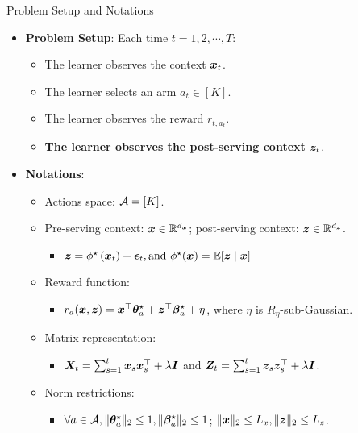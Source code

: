 \documentclass[10pt, xcolor={dvipsnames,x11names},compress]{beamer}
\begin{document}
\begin{frame}[label=Background]{Problem Setup and Notations}

\begin{itemize}
    \item \textbf{Problem Setup}: Each time $t = 1, 2, \cdots, T$:
    \begin{itemize}
        \item The learner observes the context ${\bm{x}}_t$.
        \item The learner selects an arm $a_t \in [K] $.
        \item The learner observes the reward $r_{t,a_t}$.
        \item \textcolor{dgreen}{\textbf{The learner observes the post-serving context ${\bm{z}}_t$}}.
    \end{itemize}
\end{itemize}


\begin{itemize} \color{gray}
    \item \textbf{Notations}:
    \begin{itemize} \color{gray}
        \item Actions space: ${\mathcal{A}} = [K]$.
        
        \item Pre-serving context: ${\bm{x}} \in {\mathbb{R}}^{d_{{\bm{x}}}}$; post-serving context: ${\bm{z}} \in {\mathbb{R}}^{d_{{\bm{z}}}}$.
        \begin{itemize} \color{gray}
            \item ${\bm{z}} = \phi^{\star}\left({\bm{x}}_t\right)+{\bm{\epsilon}}_t, \text{and } \phi^{\star}({\bm{x}})={\mathbb{E}}[{\bm{z}} \mid {\bm{x}}]$
        \end{itemize}
        
        \item Reward function: 
        \begin{itemize} \color{gray}
            \item $r_{a}({\bm{x}}, {\bm{z}}) = {\bm{x}}^\top {\bm{\theta}}_a^\star + {\bm{z}}^\top {\bm{\beta}}_a^\star + \eta$, where $\eta$ is $R_{\eta}$-sub-Gaussian.
        \end{itemize}
        
        \item Matrix representation: 
        \begin{itemize} \color{gray}
            \item ${\bm{X}}_{t} = \sum_{s=1}^t {\bm{x}}_s{\bm{x}}_s^\top + \lambda {\bm{I}}$ and ${\bm{Z}}_t = \sum_{s=1}^t {\bm{z}}_s {\bm{z}}_s^\top + \lambda {\bm{I}}$.
        \end{itemize}
        
        \item Norm restrictions: 
        \begin{itemize} \color{gray}
            \item $\forall a \in {\mathcal{A}}, \|{\bm{\theta}}_a^\star\|_2\leq 1, \|{\bm{\beta}}_{a}^\star\|_2\leq 1 $; $\|{\bm{x}}\|_2\leq L_x, \|{\bm{z}}\|_2 \leq L_z$.
        \end{itemize}
        
    \end{itemize}
\end{itemize}

\end{frame}
\end{document}
